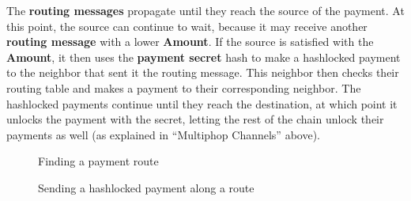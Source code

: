 \documentclass[a4paper]{article}
\newcommand{\bgls}[1]{\textbf{\gls{#1}}}
\newcommand{\bglspl}[1]{\textbf{\glspl{#1}}}
\begin{document}
The \bglspl{routing message} propagate until they reach the source of the payment. At this point, the source can continue to wait, because it may receive another \bgls{routing message} with a lower \textbf{Amount}. If the source is satisfied with the \textbf{Amount}, it then uses the \bgls{payment secret} hash to make a hashlocked payment to the neighbor that sent it the routing message. This neighbor then checks their routing table and makes a payment to their corresponding neighbor. The hashlocked payments continue until they reach the destination, at which point it unlocks the payment with the secret, letting the rest of the chain unlock their payments as well (as explained in ``Multiphop Channels'' above).

\pagebreak

\begin{figure}[H]
\centering
{}
\caption{Finding a payment route}
\end{figure}

\begin{figure}[H]
\centering
{}
\caption{Sending a hashlocked payment along a route}
\end{figure}
\end{document}

